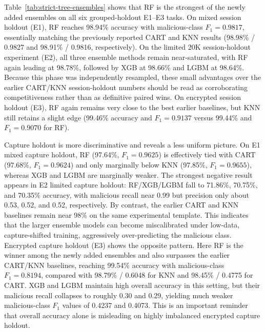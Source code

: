 \documentclass[conference]{IEEEtran}
\begin{document}
Table~\ref{tab:strict-tree-ensembles} shows that RF is the strongest of the newly added ensembles on all six grouped-holdout E1--E3 tasks. On mixed session holdout (E1), RF reaches 98.94\% accuracy with malicious-class $F_1=0.9817$, essentially matching the previously reported CART and KNN results (98.98\% / 0.9827 and 98.91\% / 0.9816, respectively). On the limited 20K session-holdout experiment (E2), all three ensemble methods remain near-saturated, with RF again leading at 98.78\%, followed by XGB at 98.66\% and LGBM at 98.64\%. Because this phase was independently resampled, these small advantages over the earlier CART/KNN session-holdout numbers should be read as corroborating competitiveness rather than as definitive paired wins. On encrypted session holdout (E3), RF again remains very close to the best earlier baselines, but KNN still retains a slight edge (99.46\% accuracy and $F_1=0.9137$ versus 99.44\% and $F_1=0.9070$ for RF).

Capture holdout is more discriminative and reveals a less uniform picture. On E1 mixed capture holdout, RF (97.64\%, $F_1=0.9625$) is effectively tied with CART (97.68\%, $F_1=0.9624$) and only marginally below KNN (97.85\%, $F_1=0.9655$), whereas XGB and LGBM are marginally weaker. The strongest negative result appears in E2 limited capture holdout: RF/XGB/LGBM fall to 71.86\%, 70.75\%, and 70.35\% accuracy, with malicious recall near 0.99 but precision only about 0.53, 0.52, and 0.52, respectively. By contrast, the earlier CART and KNN baselines remain near 98\% on the same experimental template. This indicates that the larger ensemble models can become miscalibrated under low-data, capture-shifted training, aggressively over-predicting the malicious class. Encrypted capture holdout (E3) shows the opposite pattern. Here RF is the winner among the newly added ensembles and also surpasses the earlier CART/KNN baselines, reaching 99.54\% accuracy with malicious-class $F_1=0.8194$, compared with 98.79\% / 0.6048 for KNN and 98.45\% / 0.4775 for CART. XGB and LGBM maintain high overall accuracy in this setting, but their malicious recall collapses to roughly 0.30 and 0.29, yielding much weaker malicious-class $F_1$ values of 0.4237 and 0.4073. This is an important reminder that overall accuracy alone is misleading on highly imbalanced encrypted capture holdout.
\end{document}
